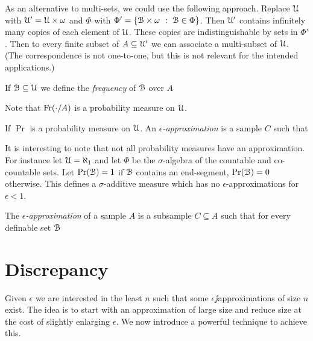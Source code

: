 \documentclass[sputnik.tex]{subfiles}
\begin{document}
As an alternative to multi-sets, we could use the following approach. Replace $\EuScript U$ with $\EuScript U'=\EuScript U\times\omega$ and $\Phi$ with $\Phi'=\{\B\times\omega\ :\ \B\in\Phi\}$. Then $\EuScript U'$ contains infinitely many copies of each element of $\EuScript U$. These copies are indistinguishable by sets in $\Phi'$. Then to every finite subset of $A\subseteq\EuScript U'$ we can associate a multi-subset of $\EuScript U$. (The correspondence is not one-to-one, but this is not relevant for the intended applications.)


If $\EuScript B\subseteq\EuScript U$ we define the \emph{frequency\/} of $\EuScript B$ over $A$


Note that $\mathop{\rm Fr}(\cdot/A)$ is a probability measure on $\EuScript U$.

If $\Pr$ is a probability measure on $\EuScript U$. An \emph{$\epsilon$-approximation\/} is a sample $C$ such that  


It is interesting to note that not all probability measures have an approximation. For instance let $\EuScript U=\aleph_1$ and let $\Phi$ be the $\sigma$-algebra of the countable and co-countable sets. Let $\Pr(\EuScript B)=1$ if $\EuScript B$ contains an end-segment, $\Pr(\EuScript B)=0$ otherwise. This defines a $\sigma$-additive measure which has no $\epsilon$-approximations for $\epsilon<1$. 

The \emph{$\epsilon$-approximation\/} of a sample $A$ is a subsample $C\subseteq A$ such that for every definable set $\EuScript B$


\section{Discrepancy}\label{epsilon_approximations}

Given $\epsilon$ we are interested in the least $n$ such that some $\epsilon\jj$approximations of size $n$ exist.
The idea is to start with an approximation of large size and reduce size at the cost of slightly enlarging $\epsilon$.
We now introduce a powerful technique to achieve this.
\end{document}
